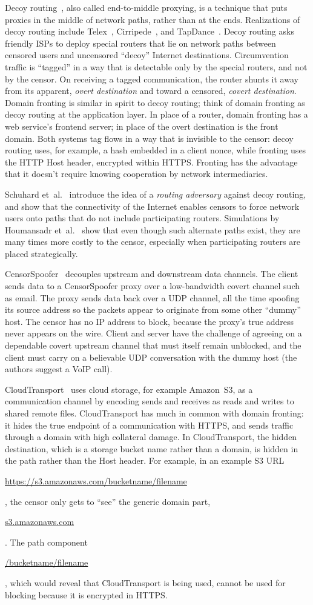 \documentclass[conference]{IEEEtran}
\def\urll#1{\begin{NoHyper}\url{#1}\end{NoHyper}}
\begin{document}
Decoy routing~\cite{decoyrouting}, also called end-to-middle proxying,
is a technique that puts
proxies in the middle of network paths, rather than at the ends.
Realizations of decoy routing include Telex~\cite{telex},
Cirripede~\cite{cirripede}, and TapDance~\cite{tapdance}.
Decoy routing asks friendly ISPs to deploy special routers that lie
on network paths between censored users and uncensored ``decoy'' Internet destinations.
Circumvention traffic is ``tagged'' in a way that is detectable only
by the special routers, and not by the censor.
On receiving a tagged communication, the router shunts it away from its apparent, \emph{overt destination}
and toward a censored, \emph{covert destination}.
Domain fronting is similar in spirit to decoy routing;
think of domain fronting as decoy routing at the application layer.
In place of a router, domain fronting has a web service's frontend server;
in place of the overt destination is the front domain.
Both systems tag flows in a way that is invisible to the censor:
decoy routing uses, for example, a hash embedded in a client nonce,
while fronting uses the HTTP Host header, encrypted within HTTPS.
Fronting has the advantage that it doesn't require knowing cooperation by network intermediaries.

Schuhard et~al.~\cite{ccs2012-decoys}
introduce the idea of a \emph{routing adversary} against decoy routing,
and show that the connectivity of the Internet enables
censors to force network users onto paths that do not include participating routers.
Simulations by Houmansadr et~al.~\cite{nodirectionhome}
show that even though such alternate paths exist,
they are many times more costly to the censor,
especially when participating routers are placed strategically.

CensorSpoofer~\cite{censorspoofer}
decouples upstream and downstream data channels.
The client sends data to a CensorSpoofer proxy over a low-bandwidth covert channel such as email.
The proxy sends data back over a UDP channel, all the time
spoofing its source address so the packets appear to originate from some other ``dummy'' host.
The censor has no IP address to block, because the proxy's true address never appears on the wire.
Client and server have the challenge of agreeing on a dependable covert upstream channel
that must itself remain unblocked,
and the client must carry on a believable UDP conversation with the dummy host
(the authors suggest a VoIP call).

CloudTransport~\cite{cloudtransport} uses cloud storage, for example Amazon~S3,
as a communication channel by encoding sends and receives as reads and writes to shared remote files.
CloudTransport has much in common with domain fronting:
it hides the true endpoint of a communication with HTTPS,
and sends traffic through a domain with high collateral damage.
In CloudTransport, the hidden destination, which is a storage bucket name rather than a domain,
is hidden in the path rather than the Host header.
For example, in an example S3 URL
\urll{https://s3.amazonaws.com/bucketname/filename},
the censor only gets to ``see'' the generic domain part, \urll{s3.amazonaws.com}.
The path component \urll{/bucketname/filename},
which would reveal that CloudTransport is being used,
cannot be used for blocking because it is encrypted in HTTPS.
\end{document}
